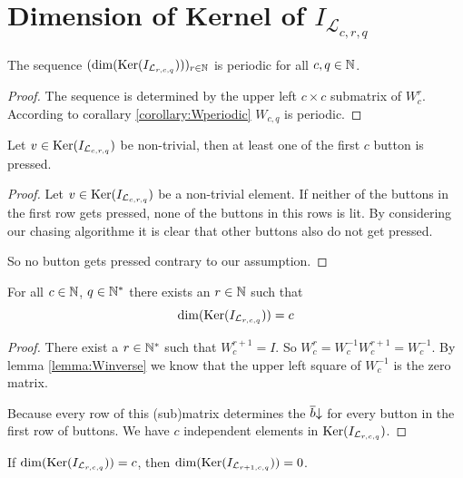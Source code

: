 \section{Dimension of Kernel of $I_{\mathcal{L}_{c,r,q}}$}

\begin{theorem}
	The sequence $(\dim(\operatorname{Ker}(I_{\mathcal{L}_{r,c,q}})))_{r\in\mathbb{N}}$ is
	periodic for all $c,q\in \mathbb{N}$. 	
\end{theorem}

\begin{proof}
	The sequence is determined by the upper left $c \times c$ submatrix of
	$W_{c}^r$. According to corallary \ref{corollary:Wperiodic} $W_{c,q}$ is
	periodic.
\end{proof}

\begin{lemma}
	Let $v\in \operatorname{Ker}(I_{\mathcal{L}_{c,r,q}})$ be non-trivial, then at least
	one of the first $c$ button is pressed.
\end{lemma}

\begin{proof}
	Let $v\in\operatorname{Ker}(I_{\mathcal{L}_{c,r,q}})$ be a non-trivial element. If
	neither of the buttons in the first row gets pressed, none of the
	buttons in this rows is lit. By	considering our chasing algorithme it is
	clear that other buttons also do not get pressed.
	
	So no button gets pressed contrary to our assumption.
\end{proof}

\begin{proposition}\label{proposition:WpowerI}
	For all $c\in\mathbb{N}$, $q\in\mathbb{N}^{*}$ there exists an $r\in\mathbb{N}$ such that
	\[
		\dim(\operatorname{Ker}(I_{\mathcal{L}_{r,c,q}})) = c
	\]
\end{proposition}

\begin{proof}
	There exist a $r\in\mathbb{N}^{*}$ such that $W_{c}^{r+1} = I$. So $W_{c}^{r} =
	W_{c}^{-1}W_{c}^{r+1} = W_{c}^{-1}$. By lemma \ref{lemma:Winverse} we
	know that the upper left square of $W_{c}^{-1}$ is the zero matrix.
	
	Because every row of this (sub)matrix determines the $\overline{b}\negthickspace\downarrow$
	for every button in the first row of buttons. We have $c$ independent
	elements in $\operatorname{Ker}(I_{\mathcal{L}_{r,c,q}})$.
\end{proof}

\begin{corollary}
	If $\dim(\operatorname{Ker}(I_{\mathcal{L}_{r,c,q}})) = c$, then
	$\dim(\operatorname{Ker}(I_{\mathcal{L}_{r+1,c,q}})) = 0$. 
\end{corollary}

